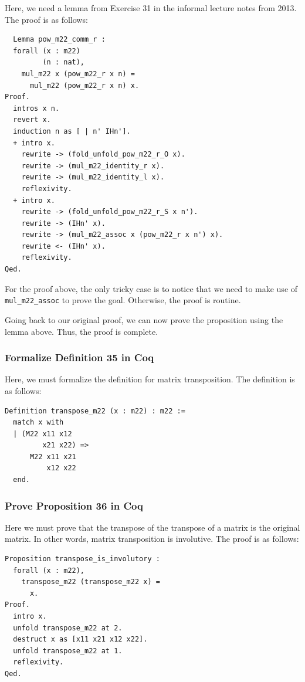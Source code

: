 \documentclass{article}
\begin{document}
Here, we need a lemma from Exercise 31 in the informal lecture notes from 2013. The proof is as follows:

\begin{lstlisting}
  Lemma pow_m22_comm_r :
  forall (x : m22)
         (n : nat),
    mul_m22 x (pow_m22_r x n) =
      mul_m22 (pow_m22_r x n) x.
Proof.
  intros x n.
  revert x.
  induction n as [ | n' IHn'].
  + intro x.
    rewrite -> (fold_unfold_pow_m22_r_O x).
    rewrite -> (mul_m22_identity_r x).
    rewrite -> (mul_m22_identity_l x).
    reflexivity.
  + intro x.
    rewrite -> (fold_unfold_pow_m22_r_S x n').
    rewrite -> (IHn' x).
    rewrite -> (mul_m22_assoc x (pow_m22_r x n') x).
    rewrite <- (IHn' x).
    reflexivity.
Qed.
\end{lstlisting}

For the proof above, the only tricky case is to notice that we need to make use of \texttt{mul\_m22\_assoc} to prove the goal. Otherwise, the proof is routine.

Going back to our original proof, we can now prove the proposition using the lemma above. Thus, the proof is complete.

\subsubsection{Formalize Definition 35 in Coq}

Here, we must formalize the definition for matrix transposition. The definition is as follows:

\begin{lstlisting}
Definition transpose_m22 (x : m22) : m22 :=
  match x with
  | (M22 x11 x12
         x21 x22) =>
      M22 x11 x21
          x12 x22
  end.
\end{lstlisting}

\subsubsection{Prove Proposition 36 in Coq}

Here we must prove that the transpose of the transpose of a matrix is the original matrix. In other words, matrix transposition is involutive. The proof is as follows:

\begin{lstlisting}
Proposition transpose_is_involutory :
  forall (x : m22),
    transpose_m22 (transpose_m22 x) =
      x.
Proof.
  intro x.
  unfold transpose_m22 at 2.
  destruct x as [x11 x21 x12 x22].
  unfold transpose_m22 at 1.
  reflexivity.
Qed.
\end{lstlisting}
\end{document}
